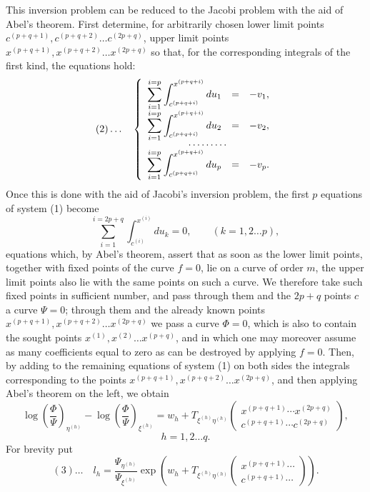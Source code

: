 \documentclass[10pt]{article}
\begin{document}
This inversion problem can be reduced to the Jacobi problem with the aid of Abel's theorem. First determine, for arbitrarily chosen lower limit points \(c^{(p+q+1)},c^{(p+q+2)}\ldots c^{(2p+q)}\), upper limit points \(x^{(p+q+1)},x^{(p+q+2)}\ldots x^{(2p+q)}\) so that, for the corresponding integrals of the first kind, the equations hold:
\[
(2)\ldots\quad
\left\{\begin{array}{rcl}
\displaystyle\sum_{i=1}^{i=p}\int_{c^{(p+q+i)}}^{x^{(p+q+i)}}du_1&=&-v_1,\\
\displaystyle\sum_{i=1}^{i=p}\int_{c^{(p+q+i)}}^{x^{(p+q+i)}}du_2&=&-v_2,\\[-0.2em]
\multicolumn{3}{c}{\cdots\cdots\cdots}\\[-0.2em]
\displaystyle\sum_{i=1}^{i=p}\int_{c^{(p+q+i)}}^{x^{(p+q+i)}}du_p&=&-v_p.
\end{array}\right.
\]
Once this is done with the aid of Jacobi's inversion problem, the first \(p\) equations of system (1) become
\[
\sum_{i=1}^{i=2p+q}\int_{c^{(i)}}^{x^{(i)}}du_k=0,\qquad(k=1,2\ldots p),
\]
equations which, by Abel's theorem, assert that as soon as the lower limit points, together with fixed points of the curve \(f=0\), lie on a curve of order \(m\), the upper limit points also lie with the same points on such a curve. We therefore take such fixed points in sufficient number, and pass through them and the \(2p+q\) points \(c\) a curve \(\Psi=0\); through them and the already known points \(x^{(p+q+1)},x^{(p+q+2)}\ldots x^{(2p+q)}\) we pass a curve \(\Phi=0\), which is also to contain the sought points \(x^{(1)},x^{(2)}\ldots x^{(p+q)}\), and in which one may moreover assume as many coefficients equal to zero as can be destroyed by applying \(f=0\). Then, by adding to the remaining equations of system (1) on both sides the integrals corresponding to the points \(x^{(p+q+1)},x^{(p+q+2)}\ldots x^{(2p+q)}\), and then applying Abel's theorem on the left, we obtain
\[
\log\left(\frac{\Phi}{\Psi}\right)_{\eta^{(h)}}-
\log\left(\frac{\Phi}{\Psi}\right)_{\xi^{(h)}}
=w_h+T_{\xi^{(h)}\eta^{(h)}}\begin{pmatrix}x^{(p+q+1)}\cdots x^{(2p+q)}\\c^{(p+q+1)}\cdots c^{(2p+q)}\end{pmatrix},
\]
\[
h=1,2\ldots q.
\]
For brevity put
\[
(3)\ldots\quad
l_h=\frac{\Psi_{\eta^{(h)}}}{\Psi_{\xi^{(h)}}}
\exp\!\left(w_h+T_{\xi^{(h)}\eta^{(h)}}\begin{pmatrix}x^{(p+q+1)}\cdots\\c^{(p+q+1)}\cdots\end{pmatrix}\right).
\]
\end{document}
